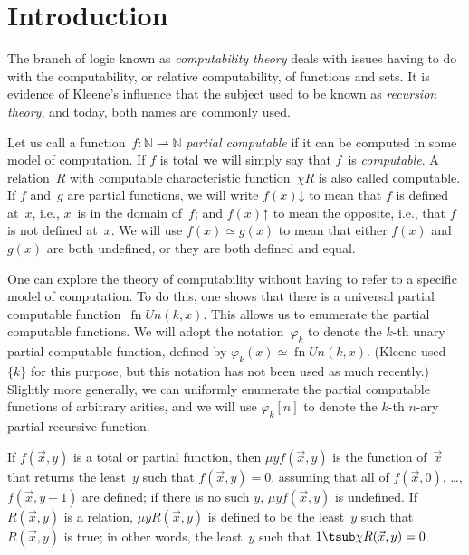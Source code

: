 \documentclass[10pt,a4paper]{article}
\theoremstyle{plain}
\theoremstyle{definition}
\theoremstyle{remark}
\newcommand*{\olfileid}[3]{}
\newcommand*{\olsection}[1]{\section*{#1}}
\providecommand{\cfind}[1]{\varphi_{#1}}
\providecommand{\Nat}{\ensuremath{\mathbb{N}}}
\providecommand{\fdefined}{\mathord{\downarrow}}
\providecommand{\pto}{\rightharpoonup}
\providecommand{\Char}{\chi}
\providecommand{\umin}{\mu}
\providecommand{\fundefined}{\mathord{\uparrow}}
\providecommand{\fn}{\operatorname{fn}}
\begin{document}



\olfileid{cmp}{thy}{int}
\olsection{Introduction}

The branch of logic known as \emph{computability theory} deals with
issues having to do with the computability, or relative computability,
of functions and sets. It is evidence of Kleene's influence
that the subject used to be known as \emph{recursion theory}, and
today, both names are commonly used.

Let us call a function~$f\colon \Nat \pto \Nat$ \emph{partial
  computable} if it can be computed in some model of computation. If
$f$ is total we will simply say that $f$~is \emph{computable}. A
relation~$R$ with computable characteristic function~$\Char{R}$ is
also called computable. If $f$ and~$g$ are partial functions, we will
write $f(x) \fdefined$ to mean that $f$ is defined at~$x$, i.e., $x$~is
in the domain of~$f$; and $f(x) \fundefined$ to mean the opposite,
i.e., that $f$ is not defined at~$x$. We will use $f(x) \simeq g(x)$
to mean that either $f(x)$ and $g(x)$ are both undefined, or they are
both defined and equal.

One can explore the theory of computability without having to refer to
a specific model of computation. To do this, one shows that there is a
universal partial computable function~$\fn{Un}(k, x)$. This allows us
to enumerate the partial computable functions. We will adopt the
notation~$\cfind{k}$ to denote the $k$-th unary partial computable
function, defined by $\cfind{k}(x) \simeq \fn{Un}(k, x)$. (Kleene used
$\{ k \}$ for this purpose, but this notation has not been used as
much recently.)  Slightly more generally, we can uniformly enumerate
the partial computable functions of arbitrary arities, and we will use
$\cfind{k}[n]$ to denote the $k$-th $n$-ary partial recursive
function.

If $f(\vec x, y)$ is a total or partial function, then $\umin{y}{f
(\vec x, y)}$ is the function of~$\vec x$ that returns the least~$y$
such that $f(\vec x, y) = 0$, assuming that all of $f(\vec x, 0)$,
\dots, $f(\vec x, y-1)$ are defined; if there is no such $y$,
$\umin{y}{f (\vec x, y)}$ is undefined. If $R(\vec x, y)$ is a
relation, $\umin{y}{R(\vec x, y)}$ is defined to be the least~$y$ such
that $R(\vec x, y)$ is true; in other words, the least~$y$ such that
$1 \tsub \Char{R}(\vec x, y) = 0$.
\end{document}
